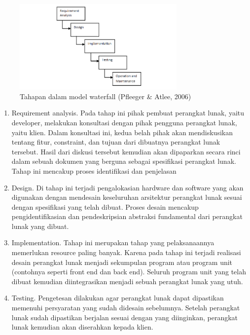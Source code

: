 \documentclass[12pt]{article}
\begin{document}
\begin{enumerate}[label=\textbf{3.\arabic*}]
    \begin{figure}[H]
        \centering \includegraphics[width=0.75\textwidth]{images/landasan teori/waterfall.png}
        \caption{Tahapan dalam model waterfall (Pfleeger & Atlee, 2006)}
        \label{fig:landasan-waterfall}
    \end{figure}    
    

    \begin{enumerate}[label=\arabic*.]
        \item Requirement analysis. Pada tahap ini pihak pembuat perangkat lunak, yaitu developer, melakukan konsultasi dengan pihak pengguna perangkat lunak, yaitu klien. Dalam konsultasi ini, kedua belah pihak akan mendiskusikan tentang fitur, constraint, dan tujuan dari dibuatnya perangkat lunak tersebut. Hasil dari diskusi tersebut kemudian akan dipaparkan secara rinci dalam sebuah dokumen yang  berguna sebagai spesifikasi perangkat lunak. Tahap ini mencakup proses identifikasi dan penjelasan

        \item Design. Di tahap ini terjadi pengalokasian hardware dan software yang akan digunakan dengan mendesain keseluruhan arsitektur perangkat lunak sesuai dengan spesifikasi yang telah dibuat. Proses desain mencakup pengidentifikasian dan pendeskripsian abstraksi fundamental dari perangkat lunak yang dibuat.
        
        \item Implementation. Tahap ini merupakan tahap yang pelaksanaannya memerlukan resource paling banyak. Karena pada tahap ini terjadi realisasi desain perangkat lunak menjadi sekumpulan program atau program unit (contohnya seperti front end dan back end). Seluruh program unit yang telah dibuat kemudian diintegrasikan menjadi sebuah perangkat lunak yang utuh.
        
        \item Testing. Pengetesan dilakukan agar perangkat lunak dapat dipastikan memenuhi persyaratan yang sudah didesain sebelumnya. Setelah perangkat lunak sudah dipastikan berjalan sesuai dengan yang diinginkan, perangkat lunak kemudian akan diserahkan kepada klien.


\end{enumerate}
\end{enumerate}
\end{document}
